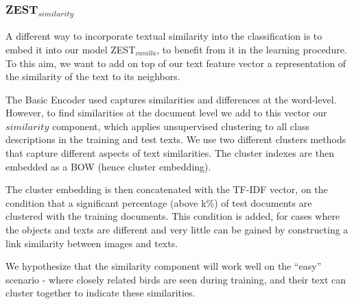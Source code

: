 \documentclass[11pt,a4paper]{article}
\newcommand\yuval[1]{\textcolor{darkpink}{\textbf{YUVAL:} #1 }}
\newcommand\reut[1]{\textcolor{green}{\textbf{REUT:} #1 }}
\begin{document}
\subsubsection{ZEST$_{similarity}$}
\label{section:similarity_component}

A different way to incorporate textual similarity into the classification is to embed it into our model ZEST$_{vanilla}$, to benefit from it in the learning procedure. To this aim, we want to add on top of our text feature vector a representation of the similarity of the text to its neighbors. \par


The Basic Encoder used captures similarities and differences at the word-level. However, to find similarities at the document level we add to this vector our $similarity$ component, %
which applies unsupervised clustering to all class descriptions in the training and test texts. We use two different clusters methods that capture different aspects of text similarities. The cluster indexes are then embedded as a BOW (hence cluster embedding). \par


The cluster embedding is then concatenated with the TF-IDF vector, on the condition that a significant percentage (above k\%) of test documents are clustered with the training documents. This condition is added, for cases where the objects and texts are different and very little can be gained by constructing a link similarity between images and texts.
\par
We hypothesize that the similarity component will work well on the \enquote{easy} scenario - where closely related birds are seen during training, and their text can cluster together to indicate these similarities.
\end{document}
